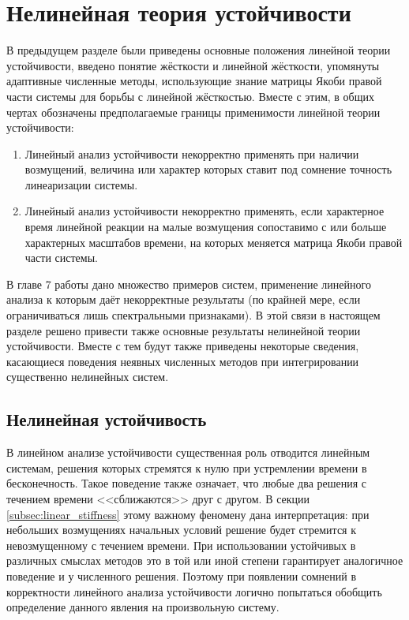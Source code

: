 \section{Нелинейная теория устойчивости}
\label{sec:nonlinear_stability}

В предыдущем разделе были приведены основные положения линейной теории устойчивости,
введено понятие жёсткости и линейной жёсткости,
упомянуты адаптивные численные методы, использующие знание матрицы Якоби правой части системы для борьбы с линейной жёсткостью.
Вместе с этим, в общих чертах обозначены предполагаемые границы применимости линейной теории устойчивости:
\begin{enumerate}
    \item
        Линейный анализ устойчивости некорректно применять при наличии возмущений,
        величина или характер которых ставит под сомнение точность линеаризации системы.
    \item
        Линейный анализ устойчивости некорректно применять,
        если характерное время линейной реакции на малые возмущения сопоставимо с или больше характерных масштабов времени,
        на которых меняется матрица Якоби правой части системы.
\end{enumerate}

В главе 7 работы \cite{lambert1991methods} дано множество примеров систем,
применение линейного анализа к которым даёт некорректные результаты
(по крайней мере, если ограничиваться лишь спектральными признаками).
В этой связи в настоящем разделе решено привести также основные результаты нелинейной теории устойчивости.
Вместе с тем будут также приведены некоторые сведения,
касающиеся поведения неявных численных методов при интегрировании существенно нелинейных систем.


\subsection{Нелинейная устойчивость}
\label{subsec:nonlinear_stability}

В линейном анализе устойчивости существенная роль отводится линейным системам,
решения которых стремятся к нулю при устремлении времени в бесконечность.
Такое поведение также означает, что любые два решения с течением времени <<сближаются>> друг с другом.
В секции \ref{subsec:linear_stiffness} этому важному феномену дана интерпретация:
при небольших возмущениях начальных условий решение будет стремится к невозмущенному с течением времени.
При использовании устойчивых в различных смыслах методов это в той или иной степени гарантирует аналогичное поведение и у численного решения.
Поэтому при появлении сомнений в корректности линейного анализа устойчивости логично попытаться обобщить определение данного явления на произвольную систему.

